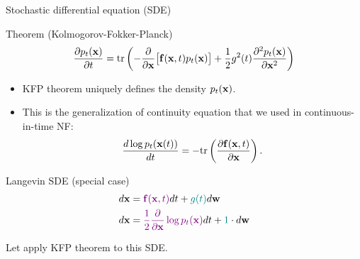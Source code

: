 \begin{frame}{Stochastic differential equation (SDE)}
 	\begin{block}{Theorem (Kolmogorov-Fokker-Planck)}
 		\vspace{-0.2cm}
 		\[
 			\frac{\partial p_t(\mathbf{x})}{\partial t} = \text{tr}\left(- \frac{\partial}{\partial \mathbf{x}} \bigl[ \mathbf{f}(\mathbf{x}, t) p_t(\mathbf{x})\bigr] + \frac{1}{2} g^2(t) \frac{\partial^2 p_t(\mathbf{x})}{\partial \mathbf{x}^2} \right)
 		\]
 		\vspace{-0.2cm}
 	\end{block}
 	 \begin{itemize}
 	 	\item KFP theorem uniquely defines the density $p_t(\mathbf{x})$.
 		 \item This is the generalization of continuity equation that we used in continuous-in-time NF:
 	 	\[
 	 		\frac{d \log p_t(\mathbf{x}(t))}{d t} = - \text{tr} \left( \frac{\partial \mathbf{f}(\mathbf{x}, t)}{\partial \mathbf{x}} \right).
 	 	\]
 	 \end{itemize}
	\vspace{-0.3cm}
 	\begin{block}{Langevin SDE (special case)}
 		\vspace{-0.6cm}
 		\begin{align*}
 			d\mathbf{x} &= {\color{violet}\mathbf{f}(\mathbf{x}, t)} dt + {\color{teal}g(t)} d \mathbf{w} \\
 			d \mathbf{x} &= {\color{violet}\frac{1}{2} \frac{\partial}{\partial \mathbf{x}} \log p_t(\mathbf{x})} d t + {\color{teal} 1 } \cdot d \mathbf{w}
 		\end{align*}
 		\vspace{-0.4cm}
 	\end{block}
 	Let apply KFP theorem to this SDE.
\end{frame}
